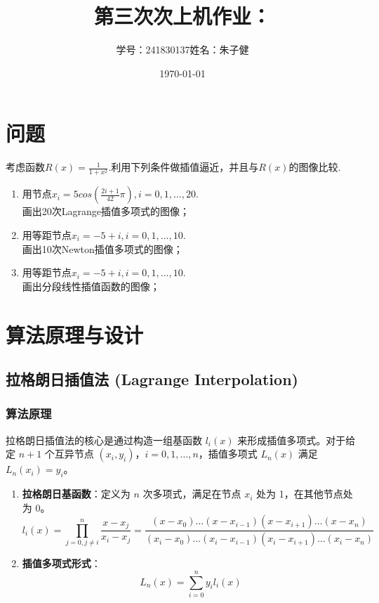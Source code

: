 \documentclass{article}
\title{第三次次上机作业：}
\author{学号：241830137\quad 姓名：朱子健}
\date{\today}
\begin{document}
\maketitle

\section{问题}
考虑函数\(R(x)=\frac{1}{1+x^2}\).利用下列条件做插值逼近，并且与\(R(x)\)的图像比较.
\begin{enumerate}[(1)]
    \item 用节点\(x_i = 5cos(\frac{2i+1}{42}\pi), i = 0, 1,...,20\).\\
          画出20次Lagrange插值多项式的图像；
    \item 用等距节点\(x_i = -5 + i, i = 0, 1,...,10\).\\
          画出10次Newton插值多项式的图像；
    \item 用等距节点\(x_i = -5 + i, i = 0, 1,...,10\).\\
          画出分段线性插值函数的图像；
\end{enumerate}
\section{算法原理与设计}
\subsection{拉格朗日插值法 (Lagrange Interpolation)}
\subsubsection{算法原理}
拉格朗日插值法的核心是通过构造一组基函数 $l_i(x)$ 来形成插值多项式。对于给定 $n+1$ 个互异节点 $(x_i, y_i)$，$i=0,1,\dots,n$，插值多项式 $L_n(x)$ 满足 $L_n(x_i) = y_i$。

\begin{enumerate}
    \item \textbf{拉格朗日基函数}：定义为 $n$ 次多项式，满足在节点 $x_i$ 处为 1，在其他节点处为 0。
    \begin{equation}
    l_i(x) = \prod_{j=0, j \neq i}^{n} \frac{x - x_j}{x_i - x_j} = \frac{(x-x_0)\dots(x-x_{i-1})(x-x_{i+1})\dots(x-x_n)}{(x_i-x_0)\dots(x_i-x_{i-1})(x_i-x_{i+1})\dots(x_i-x_n)}
    \end{equation}
    
    \item \textbf{插值多项式形式}：
    \begin{equation}
    L_n(x) = \sum_{i=0}^{n} y_i l_i(x)
    \end{equation}
\end{enumerate}
\end{document}
